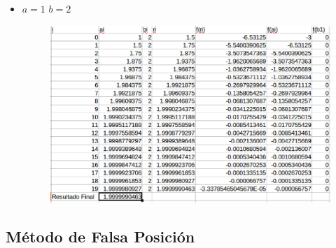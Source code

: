 \documentclass[a4paper,12pt]{article}
\begin{document}
\begin{itemize}
\begin{itemize}
       \item $a = 1$ $b = 2$
       
	\begin{figure}[h]
      \centering
      \includegraphics[scale = 0.4]{233.eps}
     \end{figure} 
      \end{itemize}
    \end{itemize}

    \newpage
    
    
    \subsection{Método de Falsa Posición}
     
\end{document}
